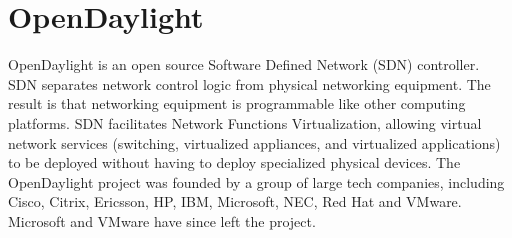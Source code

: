 \section{OpenDaylight}
OpenDaylight is an open source Software Defined Network (SDN)
controller\cite{hid-sp18-419-www-opendaylight}. SDN separates network
control logic from physical networking equipment. The result is that
networking equipment is programmable like other computing
platforms. SDN facilitates Network Functions Virtualization, allowing
virtual network services (switching, virtualized appliances, and
virtualized applications) to be deployed without having to deploy
specialized physical devices\cite{hid-sp18-419-www-cio-sdn-nfv}. The
OpenDaylight project was founded by a group of large tech companies,
including Cisco, Citrix, Ericsson, HP, IBM, Microsoft, NEC, Red Hat
and VMware. Microsoft and VMware have since left the
project\cite{hid-sp18-419-www-sdx-odl}.
